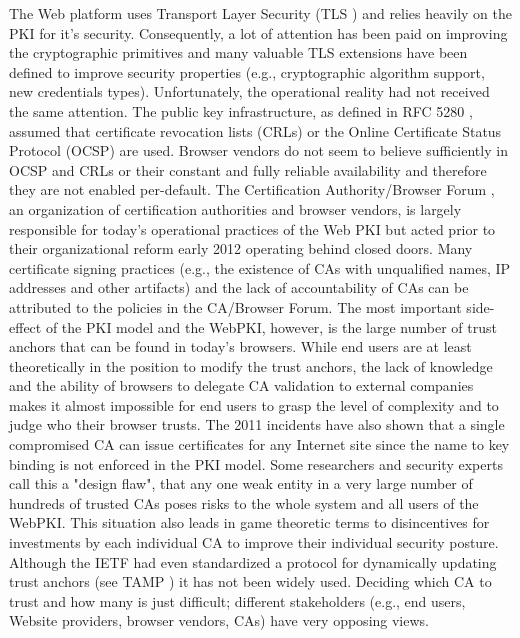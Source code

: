 \documentclass[a4paper, 10pt]{IEEEtran}
\begin{document}
The Web platform uses Transport Layer Security (TLS \cite{rfc5246}) and relies heavily on the PKI for it's security. Consequently, a lot of attention has been paid on improving the cryptographic primitives and many valuable TLS extensions have been defined to improve security properties (e.g., cryptographic algorithm support, new credentials types). Unfortunately, the operational reality had not received the same attention. The public key infrastructure, as defined in RFC 5280 \cite{rfc5280}, assumed that certificate revocation lists (CRLs) or the Online Certificate Status Protocol (OCSP) \cite{rfc2560} are used. Browser vendors do not seem to believe sufficiently in OCSP and CRLs or their constant and fully reliable availability and therefore they are not enabled per-default. The Certification Authority/Browser Forum \cite{CABrowserForum}, an organization of  certification authorities and browser vendors, is largely responsible for today's operational practices of the Web PKI but acted prior to their organizational reform early 2012 operating behind closed doors. Many certificate signing practices (e.g., the existence of CAs with unqualified names, IP addresses and other artifacts) and the lack of accountability of CAs can be attributed to the policies in the CA/Browser Forum. The most important side-effect of the PKI model and the WebPKI, however, is the large number of trust anchors that can be found in today's browsers. While end users are at least theoretically in the position to modify the trust anchors, the lack of knowledge and the ability of browsers to delegate CA validation to external companies makes it almost impossible for end users to grasp the level of complexity and to judge who their browser trusts. The 2011 incidents have also shown that a single compromised CA can issue certificates for any Internet site since the name to key binding is not enforced in the PKI model. Some researchers and security experts call this a "design flaw", that any one weak entity in a very large number of hundreds of trusted CAs poses risks to the whole system and all users of the WebPKI. This situation also leads in game theoretic terms to disincentives for investments by each individual CA to improve their individual security posture. Although the IETF had even standardized a protocol for dynamically updating trust anchors (see TAMP \cite{rfc5934}) it has not been widely used. Deciding which CA to trust and how many is just difficult; different stakeholders (e.g., end users, Website providers, browser vendors, CAs) have very opposing views. 
\end{document}
